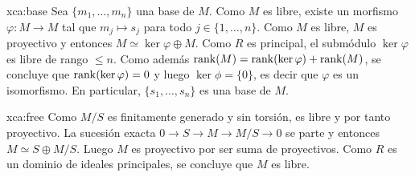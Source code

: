 \begin{sol}{xca:base}
Sea $\{m_1,\dots,m_n\}$ una base de $M$. Como $M$ es libre, existe un morfismo $\varphi\colon M\to M$ tal que $m_j\mapsto s_j$ para todo
$j\in\{1,\dots,n\}$. Como $M$ es libre, $M$ es proyectivo y entonces $M\simeq \ker\varphi\oplus M$. Como $R$ es principal, el submódulo
$\ker\varphi$ es libre de rango $\leq n$. Como además $\operatorname{rank}(M)=\operatorname{rank}(\ker\varphi)+\operatorname{rank}(M)$, se concluye que $\operatorname{rank}(\ker\varphi)=0$ y luego
$\ker\phi=\{0\}$, es decir que $\varphi$ es un isomorfismo. En particular, $\{s_1,\dots,s_n\}$ es una base de $M$.
\end{sol}

\begin{sol}{xca:free}
    Como $M/S$ es finitamente generado y sin torsión, es libre y por tanto
    proyectivo. La sucesión exacta $0\to S\to M\to M/S\to0$ se
    parte y entonces $M\simeq S\oplus M/S$. Luego $M$ es proyectivo por
    ser suma de proyectivos. Como $R$ es un dominio de ideales principales, se concluye que
    $M$ es libre.
\end{sol}